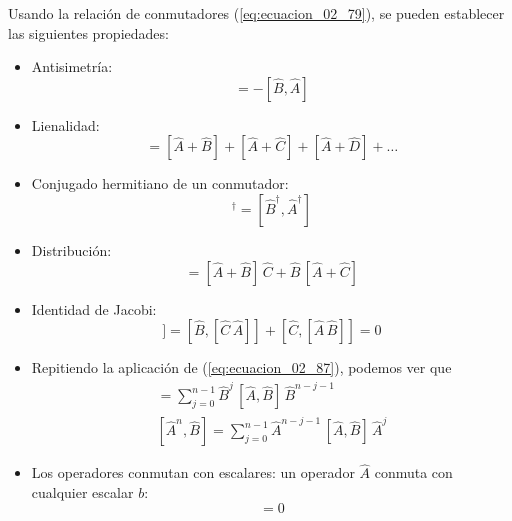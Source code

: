 Usando la relación de conmutadores (\ref{eq:ecuacion_02_79}), se pueden establecer las siguientes propiedades:
\begin{itemize}
\item Antisimetría:
\begin{equation}
[\hat{A}, \hat{B}] = - [\hat{B}, \hat{A}]
\label{eq:ecuacion_02_84}
\end{equation}
\item Lienalidad:
\begin{equation}
[\hat{A} + \hat{B} + \hat{C} + \hat{D} + \ldots] = [\hat{A} + \hat{B}] + [\hat{A} + \hat{C}] + [\hat{A} + \hat{D}] + \ldots
\label{eq:ecuacion_02_85} 
\end{equation}
\item Conjugado hermitiano de un conmutador:
\begin{equation}
[\hat{A}, \hat{B}]^{\dagger} = [\hat{B}^{\dagger}, \hat{A}^{\dagger}]
\label{eq:ecuacion_02_86}
\end{equation}
\item Distribución:
\begin{equation}
[\hat{A},  \hat{B} \, \hat{C}] = [\hat{A} + \hat{B}] \,  \hat{C} + \hat{B} \, [\hat{A} + \hat{C}]
\label{eq:ecuacion_02_87}
\end{equation}
\item Identidad de Jacobi:
\begin{equation}
[\hat{A},  [\hat{B} \, \hat{C}]] = [\hat{B}, [\hat{C} \, \hat{A}]] + [\hat{C},  [\hat{A} \, \hat{B}]] = 0
\label{eq:ecuacion_02_89}
\end{equation}
\item Repitiendo la aplicación de (\ref{eq:ecuacion_02_87}), podemos ver que
\begin{align}
[\hat{A},  \hat{B}^{n}] = \sum_{j=0}^{n-1} \hat{B}^{j} \, [\hat{A},  \hat{B}] \, \hat{B}^{n-j-1} \label{eq:ecuacion_02_90} \\
[\hat{A}^{n},  \hat{B}] = \sum_{j=0}^{n-1} \hat{A}^{n-j-1} \, [\hat{A},  \hat{B}] \, \hat{A}^{j} \label{eq:ecuacion_02_91}
\end{align}
\item Los operadores conmutan con escalares: un operador $\hat{A}$ conmuta con cualquier escalar $b$:
\begin{equation}
[ \hat{A}, b ] = 0
\label{eq:ecuacion_02_92}
\end{equation}
\end{itemize}
